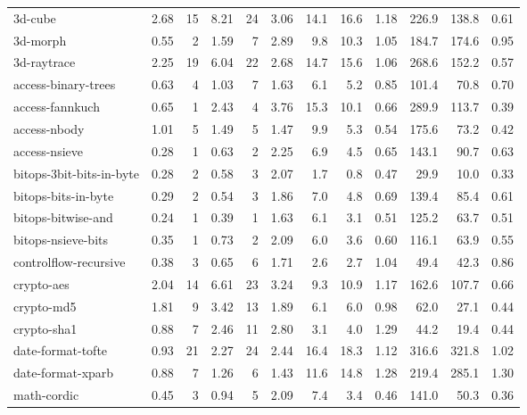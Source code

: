 \begin{figure*}[ht]
\begin{tabular}{lrrrrrrrrrrr}
3d-cube                  & 2.68 & 15 & 8.21 & 24 & 3.06
    & 14.1 & 16.6 & 1.18 & 226.9 & 138.8 & 0.61 \\
3d-morph                 & 0.55 & 2   & 1.59 & 7  & 2.89
    & 9.8  & 10.3 & 1.05 & 184.7 & 174.6 & 0.95 \\
3d-raytrace              & 2.25 & 19 & 6.04 & 22 & 2.68
    & 14.7 & 15.6 & 1.06 & 268.6 & 152.2 & 0.57 \\
access-binary-trees      & 0.63 & 4   & 1.03 & 7  & 1.63
    & 6.1  & 5.2 & 0.85   & 101.4 & 70.8  & 0.70 \\
access-fannkuch          & 0.65  & 1  & 2.43 & 4  & 3.76
    & 15.3 & 10.1 & 0.66  & 289.9 & 113.7 & 0.39 \\
access-nbody             & 1.01 & 5  & 1.49 & 5  & 1.47
    & 9.9  & 5.3 & 0.54   & 175.6 & 73.2  & 0.42 \\
access-nsieve            & 0.28 & 1   & 0.63 & 2   & 2.25
    & 6.9  & 4.5 & 0.65   & 143.1 & 90.7  & 0.63 \\
bitops-3bit-bits-in-byte & 0.28 & 2   & 0.58 & 3   & 2.07
    & 1.7  & 0.8 & 0.47    & 29.9 & 10.0   & 0.33 \\
bitops-bits-in-byte      & 0.29 & 2   & 0.54 & 3   & 1.86
    & 7.0  & 4.8 & 0.69   & 139.4 & 85.4  & 0.61 \\
bitops-bitwise-and       & 0.24 & 1   & 0.39 & 1   & 1.63
    & 6.1  & 3.1 & 0.51   & 125.2 & 63.7  & 0.51 \\
bitops-nsieve-bits       & 0.35 & 1   & 0.73 & 2   & 2.09
    & 6.0  & 3.6 & 0.60    & 116.1 & 63.9  & 0.55 \\
controlflow-recursive    & 0.38 & 3   & 0.65 & 6   & 1.71
    & 2.6  & 2.7 & 1.04  & 49.4  & 42.3  & 0.86 \\
crypto-aes               & 2.04 & 14 & 6.61 & 23 & 3.24
    & 9.3  & 10.9 & 1.17 & 162.6 & 107.7 & 0.66 \\
crypto-md5               & 1.81 & 9  & 3.42 & 13 & 1.89
    & 6.1  & 6.0 & 0.98   & 62.0  & 27.1  & 0.44 \\
crypto-sha1              & 0.88 & 7   & 2.46 & 11 & 2.80
    & 3.1  & 4.0 & 1.29  & 44.2  & 19.4  & 0.44 \\
date-format-tofte        & 0.93 & 21  & 2.27 & 24 & 2.44
    & 16.4 & 18.3 & 1.12 & 316.6 & 321.8 & 1.02 \\
date-format-xparb        & 0.88 & 7   & 1.26 & 6  & 1.43
    & 11.6 & 14.8 & 1.28 & 219.4 & 285.1 & 1.30 \\
math-cordic              & 0.45 & 3   & 0.94 & 5   & 2.09
    & 7.4  & 3.4 & 0.46   & 141.0 & 50.3  & 0.36 \\

\end{tabular}
\end{figure*}
